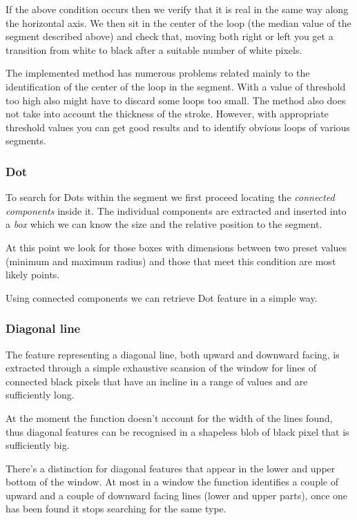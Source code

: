 If the above condition occurs then we verify that it is real in the same way along the horizontal axis. We then sit in the center of the loop (the median value of the segment described above) and check that, moving both right or left you get a transition from white to black after a suitable number of white pixels.

The implemented method has numerous problems related mainly to the identification of the center of the loop in the segment. With a value of threshold too high also might have to discard some loops too small. The method also does not take into account the thickness of the stroke.
However, with appropriate threshold values you can get good results and to identify obvious loops of various segments.

\subsubsection{Dot}

To search for Dots within the segment we first proceed locating the \emph{connected components} inside it. The individual components are extracted and inserted into a \emph{box} which we can know the size and the relative position to the segment.

At this point we look for those boxes with dimensions between two preset values (minimum and maximum radius) and those that meet this condition are most likely points.

Using connected components we can retrieve Dot feature in a simple way.

\subsubsection{Diagonal line}

The feature representing a diagonal line, both upward and downward facing, is extracted through a simple exhaustive scansion of the window for lines of connected black pixels that have an incline in a range of values and are sufficiently long.

At the moment the function doesn't account for the width of the lines found, thus diagonal features can be recognised in a shapeless blob of black pixel that is sufficiently big. 
   
There's a distinction for diagonal features that appear in the lower and upper bottom of the window.
At most in a window the function identifies a couple of upward and a couple of downward facing lines (lower and upper parts), once one has been found it stops searching for the same type.

